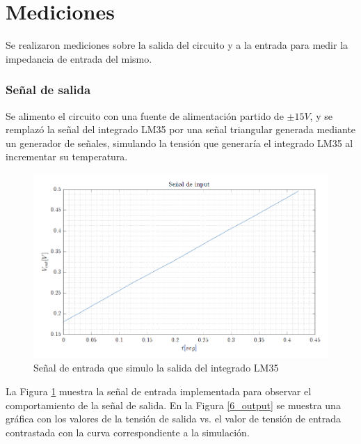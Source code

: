 \section{Mediciones}
Se realizaron mediciones sobre la salida del circuito y a la entrada para medir la impedancia de entrada del mismo.

\subsubsection{Señal de salida}
Se alimento el circuito con una fuente de alimentación partido de $\pm 15V$, y se remplazó la señal del integrado LM35 por una señal triangular generada mediante un generador de señales, simulando la tensión que generaría el integrado LM35 al incrementar su temperatura.


\begin{figure}[H]
\centering
\includegraphics[scale=0.49]{../parte6/Informe/resources/grafica_input_medicion.png}
\caption{Señal de entrada que simulo la salida del integrado LM35}
\label{6_input}
\end{figure}

La Figura \ref{6_input} muestra la señal de entrada implementada para observar el comportamiento de la señal de salida. En la Figura \ref{6_output} se muestra una gráfica con los valores de la tensión de salida vs. el valor de tensión de entrada contrastada con la curva correspondiente a la simulación.

